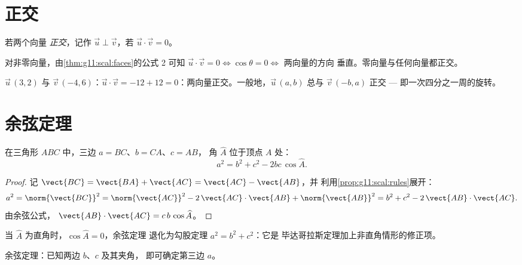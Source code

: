 \section{正交}

\begin{definition}[正交向量]\label{def:g11:scal:orthogonal}
若两个向量 \emph{正交}，记作
$\vec u \perp \vec v$，若 $\vec u \cdot \vec v = 0$。
\end{definition}

\begin{remark}
对非零向量，由\cref{thm:g11:scal:faces}的公式 2
可知 $\vec u \cdot \vec v = 0 \iff \cos\theta = 0 \iff$ 两向量的方向
垂直。零向量与任何向量都正交。
\end{remark}

\begin{example}
$\vec u\,(3, 2)$ 与 $\vec v\,(-4, 6)$：$\vec u \cdot \vec v = -12 + 12 =
0$：两向量正交。一般地，$\vec u\,(a, b)$ 总与
$\vec v\,(-b, a)$ 正交 --- 即一次四分之一周的旋转。
\end{example}

\section{余弦定理}

\begin{theorem}[余弦定理]\label{thm:g11:scal:cosines}
在三角形 $ABC$ 中，三边 $a = BC$、$b = CA$、$c = AB$，
角 $\widehat A$ 位于顶点 $A$ 处：
\[
a^2 = b^2 + c^2 - 2bc\,\cos\widehat A .
\]
\end{theorem}

\begin{proof}
记 $\vect{BC} = \vect{BA} + \vect{AC} = \vect{AC} - \vect{AB}$，并
利用\cref{prop:g11:scal:rules}展开：
\[
a^2 = \norm{\vect{BC}}^2
= \norm{\vect{AC}}^2 - 2\,\vect{AC}\cdot\vect{AB} + \norm{\vect{AB}}^2
= b^2 + c^2 - 2\,\vect{AB}\cdot\vect{AC}.
\]
由余弦公式，
$\vect{AB}\cdot\vect{AC} = c\,b\,\cos\widehat A$。
\end{proof}

\begin{remark}
当 $\widehat A$ 为直角时，$\cos\widehat A = 0$，余弦定理
退化为勾股定理 $a^2 = b^2 + c^2$：它是
毕达哥拉斯定理加上非直角情形的修正项。
\end{remark}

\begin{omfigure}

{\small 余弦定理：已知两边 $b$、$c$ 及其夹角，
即可确定第三边 $a$。}
\end{omfigure}


